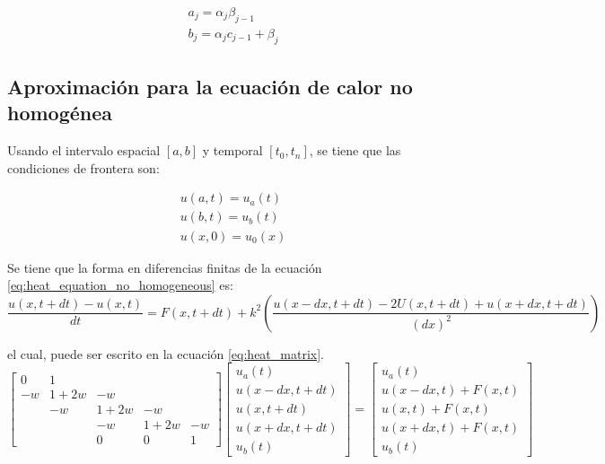 \begin{align}
    a_j = \alpha_j \beta_{j-1}  \label{eq:a_j} \\
    b_j = \alpha_j c_{j-1} + \beta_j \label{eq:b_j}
\end{align}

\subsection{Aproximación para la ecuación de calor no homogénea}

Usando el intervalo espacial $[a,b]$ y temporal $[t_0,t_n]$, se tiene que las condiciones de frontera son:

\begin{align}
    u(a,t) = u_a(t)  \nonumber \\
    u(b,t) = u_b(t)            \\
    u(x,0) = u_0(x) \nonumber
\end{align}

Se tiene que la forma en diferencias finitas de la ecuación \ref{eq:heat_equation_no_homogeneous} es:
\small
\begin{equation}
    \frac{u(x,t+dt) -u(x,t)}{dt} = F(x,t+dt) + k^2 \left (\frac{u(x-dx,t+dt)-2U(x,t+dt)+u(x+dx,t+dt)}{(dx)^2} \right )
\end{equation}
\normalsize

el cual, puede ser escrito en la ecuación \ref{eq:heat_matrix}.
\scriptsize
\begin{equation}
    \begin{bmatrix}
        0  & 1    &                  \\
        -w & 1+2w & -w               \\
           & -w   & 1+2w & -w        \\
           &      & -w   & 1+2w & -w \\
           &      & 0    & 0    & 1
    \end{bmatrix}
    \begin{bmatrix}
        u_a(t)       \\
        u(x-dx,t+dt) \\
        u(x,t+dt)    \\
        u(x+dx,t+dt) \\
        u_b(t)
    \end{bmatrix} = \begin{bmatrix}
        u_a(t)           \\
        u(x-dx,t)+F(x,t) \\
        u(x,t)+F(x,t)    \\
        u(x+dx,t)+F(x,t) \\
        u_b(t)
    \end{bmatrix} \label{eq:heat_matrix}
\end{equation}
\normalsize


